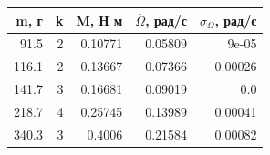\begin{tabular}{rrrrr}
\toprule
m, г & k & M, Н м & $\overline{\Omega}$, рад/с & $\sigma_\Omega$, рад/с \\
\midrule
91.5 & 2 & 0.10771 & 0.05809 & 9e-05 \\
116.1 & 2 & 0.13667 & 0.07366 & 0.00026 \\
141.7 & 3 & 0.16681 & 0.09019 & 0.0 \\
218.7 & 4 & 0.25745 & 0.13989 & 0.00041 \\
340.3 & 3 & 0.4006 & 0.21584 & 0.00082 \\
\bottomrule
\end{tabular}
